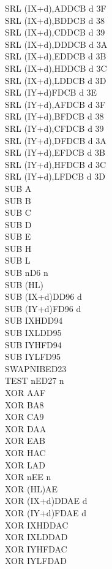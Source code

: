 \begin{multicols}{3}
{\begin{tabbing}
		SRL (IX+d),A\UNDOC\>DDCB d 3F\\
		SRL (IX+d),B\UNDOC\>DDCB d 38\\
		SRL (IX+d),C\UNDOC\>DDCB d 39\\
		SRL (IX+d),D\UNDOC\>DDCB d 3A\\
		SRL (IX+d),E\UNDOC\>DDCB d 3B\\
		SRL (IX+d),H\UNDOC\>DDCB d 3C\\
		SRL (IX+d),L\UNDOC\>DDCB d 3D\\
		SRL (IY+d)\>FDCB d 3E\\
		SRL (IY+d),A\UNDOC\>FDCB d 3F\\
		SRL (IY+d),B\UNDOC\>FDCB d 38\\
		SRL (IY+d),C\UNDOC\>FDCB d 39\\
		SRL (IY+d),D\UNDOC\>FDCB d 3A\\
		SRL (IY+d),E\UNDOC\>FDCB d 3B\\
		SRL (IY+d),H\UNDOC\>FDCB d 3C\\
		SRL (IY+d),L\UNDOC\>FDCB d 3D\\
		SUB A\\
		SUB B\\
		SUB C\\
		SUB D\\
		SUB E\\
		SUB H\\
		SUB L\\
		SUB n\>D6 n\\
		SUB (HL)\\
		SUB (IX+d)\>DD96 d\\
		SUB (IY+d)\>FD96 d\\
		SUB IXH\UNDOC\>DD94\\
		SUB IXL\UNDOC\>DD95\\
		SUB IYH\UNDOC\>FD94\\
		SUB IYL\UNDOC\>FD95\\
		SWAPNIB\ZXN\>ED23\\
		TEST n\ZXN\>ED27 n\\
		XOR A\>AF\\
		XOR B\>A8\\
		XOR C\>A9\\
		XOR D\>AA\\
		XOR E\>AB\\
		XOR H\>AC\\
		XOR L\>AD\\
		XOR n\>EE n\\
		XOR (HL)\>AE\\
		XOR (IX+d)\>DDAE d\\
		XOR (IY+d)\>FDAE d\\
		XOR IXH\UNDOC\>DDAC\\
		XOR IXL\UNDOC\>DDAD\\
		XOR IYH\UNDOC\>FDAC\\
		XOR IYL\UNDOC\>FDAD

	\end{tabbing}
}
\end{multicols}
\normalsize


\pagebreak
\IntentionallyEmpty
\pagebreak
